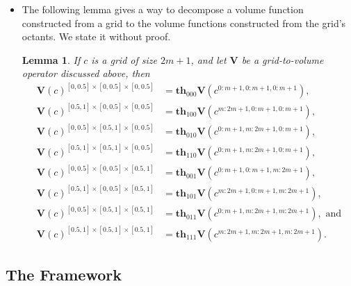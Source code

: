 \documentclass[10pt]{article}
\newtheorem{lemma}{Lemma}[section]
\newcommand{\Th}{\mathbf{th}}
\newcommand{\V}{\mathbf{V}}
\begin{document}
\begin{itemize}
	\item The following lemma gives a way to decompose a
	    volume function constructed from a grid
	    to the volume functions constructed from
	    the grid's octants. We state it without proof.
	    
	    \begin{lemma} \label{volume-octant}
	    If $c$ is a grid of size $2m+1$,
	    and let $\V$ be a grid-to-volume operator 
	    discussed above, then
	    \begin{align*}
	        \V(c)^{[0,0.5]\times[0,0.5]\times[0,0.5]} &=
	        \Th_{000}\V(c^{0:m+1,0:m+1,0:m+1}),\\
	        \V(c)^{[0.5,1]\times[0,0.5]\times[0,0.5]} &=
	        \Th_{100}\V(c^{m:2m+1,0:m+1,0:m+1}),\\
	        \V(c)^{[0,0.5]\times[0.5,1]\times[0,0.5]} &=
	        \Th_{010}\V(c^{0:m+1,m:2m+1,0:m+1}),\\
	        \V(c)^{[0.5,1]\times[0.5,1]\times[0,0.5]} &=
	        \Th_{110}\V(c^{0:m+1,m:2m+1,0:m+1}),\\	        
	        \V(c)^{[0,0.5]\times[0,0.5]\times[0.5,1]} &=
	        \Th_{001}\V(c^{0:m+1,0:m+1,m:2m+1}),\\
	        \V(c)^{[0.5,1]\times[0,0.5]\times[0.5,1]} &=
	        \Th_{101}\V(c^{m:2m+1,0:m+1,m:2m+1}),\\
	        \V(c)^{[0,0.5]\times[0.5,1]\times[0.5,1]} &=
	        \Th_{011}\V(c^{0:m+1,m:2m+1,m:2m+1}),\mbox{ and}\\
	        \V(c)^{[0.5,1]\times[0.5,1]\times[0.5,1]} &=
	        \Th_{111}\V(c^{m:2m+1,m:2m+1,m:2m+1}).
	    \end{align*}
        \end{lemma}
    	    
\end{itemize}

\subsection{The Framework} \label{framework}
\end{document}
